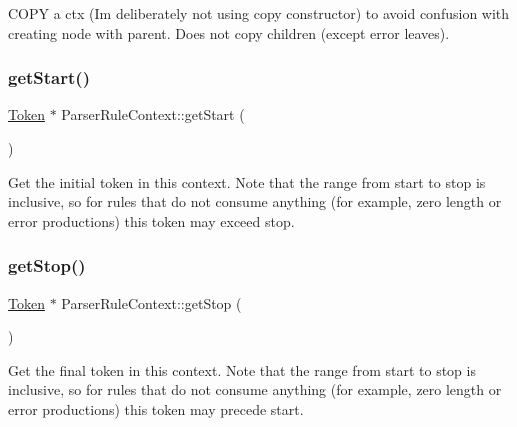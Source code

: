C\+O\+PY a ctx (I\textquotesingle{}m deliberately not using copy constructor) to avoid confusion with creating node with parent. Does not copy children (except error leaves). \mbox{\label{classantlr4_1_1ParserRuleContext_a069cff86aad00ea0618985e78291e8fa}} 
\subsubsection{\texorpdfstring{get\+Start()}{getStart()}}
{\footnotesize\ttfamily \hyperlink{classantlr4_1_1Token}{Token} $\ast$ Parser\+Rule\+Context\+::get\+Start (\begin{DoxyParamCaption}{ }\end{DoxyParamCaption})\hspace{0.3cm}{\ttfamily [virtual]}}

Get the initial token in this context. Note that the range from start to stop is inclusive, so for rules that do not consume anything (for example, zero length or error productions) this token may exceed stop. \mbox{\label{classantlr4_1_1ParserRuleContext_a51432e71c46225602c504768c50ad776}} 
\subsubsection{\texorpdfstring{get\+Stop()}{getStop()}}
{\footnotesize\ttfamily \hyperlink{classantlr4_1_1Token}{Token} $\ast$ Parser\+Rule\+Context\+::get\+Stop (\begin{DoxyParamCaption}{ }\end{DoxyParamCaption})\hspace{0.3cm}{\ttfamily [virtual]}}

Get the final token in this context. Note that the range from start to stop is inclusive, so for rules that do not consume anything (for example, zero length or error productions) this token may precede start. \mbox{\label{classantlr4_1_1ParserRuleContext_a0d7e71fc8e12b036014820a1d530b8bb}} 
